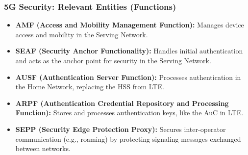 \subsubsection{5G Security: Relevant Entities (Functions)}
\begin{itemize}
    \item \textbf{AMF (Access and Mobility Management Function):} 
    Manages device access and mobility in the Serving Network.

    \item \textbf{SEAF (Security Anchor Functionality):} 
    Handles initial authentication and acts as the anchor point for security in the Serving Network.

    \item \textbf{AUSF (Authentication Server Function):} 
    Processes authentication in the Home Network, replacing the HSS from LTE.

    \item \textbf{ARPF (Authentication Credential Repository and Processing Function):} 
    Stores and processes authentication keys, like the AuC in LTE.

    \item \textbf{SEPP (Security Edge Protection Proxy):} 
    Secures inter-operator communication (e.g., roaming) by protecting signaling messages exchanged between networks.\\
    \\
\end{itemize}
